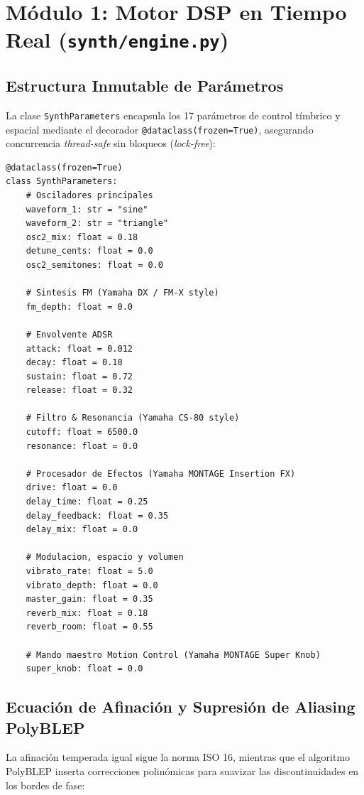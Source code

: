 \documentclass[11pt,a4paper]{article}
\begin{document}
\section{Módulo 1: Motor DSP en Tiempo Real (\texttt{synth/engine.py})}

\subsection{Estructura Inmutable de Parámetros}
La clase \texttt{SynthParameters} encapsula los 17 parámetros de control tímbrico y espacial mediante el decorador \texttt{@dataclass(frozen=True)}, asegurando concurrencia \textit{thread-safe} sin bloqueos (\textit{lock-free}):

\begin{lstlisting}
@dataclass(frozen=True)
class SynthParameters:
    # Osciladores principales
    waveform_1: str = "sine"
    waveform_2: str = "triangle"
    osc2_mix: float = 0.18
    detune_cents: float = 0.0
    osc2_semitones: float = 0.0

    # Sintesis FM (Yamaha DX / FM-X style)
    fm_depth: float = 0.0

    # Envolvente ADSR
    attack: float = 0.012
    decay: float = 0.18
    sustain: float = 0.72
    release: float = 0.32

    # Filtro & Resonancia (Yamaha CS-80 style)
    cutoff: float = 6500.0
    resonance: float = 0.0

    # Procesador de Efectos (Yamaha MONTAGE Insertion FX)
    drive: float = 0.0
    delay_time: float = 0.25
    delay_feedback: float = 0.35
    delay_mix: float = 0.0

    # Modulacion, espacio y volumen
    vibrato_rate: float = 5.0
    vibrato_depth: float = 0.0
    master_gain: float = 0.35
    reverb_mix: float = 0.18
    reverb_room: float = 0.55

    # Mando maestro Motion Control (Yamaha MONTAGE Super Knob)
    super_knob: float = 0.0
\end{lstlisting}

\subsection{Ecuación de Afinación y Supresión de Aliasing PolyBLEP}
La afinación temperada igual sigue la norma ISO 16, mientras que el algoritmo PolyBLEP inserta correcciones polinómicas para suavizar las discontinuidades en los bordes de fase:
\end{document}
